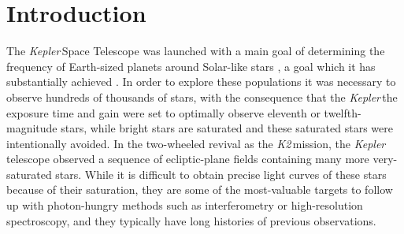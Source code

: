 \documentclass[twocolumn]{aastex62}
\newcommand\kepler{\emph{Kepler}\,}
\newcommand\ktwo{\emph{K2}\,}
\begin{document}
\begin{abstract}
While the \kepler\ mission was designed to look at tens of thousands of faint stars ($V \gtrsim 12$), brighter stars which saturate the detector are nevertheless some of the most interesting because of the ease with which they can be observed by other instruments and the wealth of knowledge about them that is already available. By considering the unsaturated scattered light `halo' around these stars we retrieve precise light curves of most of the brightest stars in \ktwo fields from Campaign 6 onwards. This halo campaign reveals stellar variability ubiquitously, including effects of stellar pulsation, rotation, and binarity. Here we describe our pipeline, and present a catalogue of the halo sources, with classifications and parametrizations of their variability and remarks on interesting objects. These light curves are publicly available as a High Level Science Product from the Mikulski Archive for Space Telescopes (MAST). \href{https://github.com/benjaminpope/k2halo}{\color{linkcolor}\faGithub} %
\end{abstract}



\section{Introduction} 
\label{sec:intro}

The \kepler Space Telescope was launched with a main goal of determining the frequency of Earth-sized planets around Solar-like stars \citep{2010sci...327..977b}, a goal which it has substantially achieved \citep[e.g.][]{2013ApJ...766...81F,2013PNAS..11019273P,2014ApJ...795...64F}. In order to explore these populations it was necessary to observe hundreds of thousands of stars, with the consequence that the \kepler the exposure time and gain were set to optimally observe eleventh or twelfth-magnitude stars, while bright stars are saturated and these saturated stars were intentionally avoided. In the two-wheeled revival as the \ktwo mission, the \kepler telescope observed a sequence of ecliptic-plane fields containing many more very-saturated stars. While it is difficult to obtain precise light curves of these stars because of their saturation, they are some of the most-valuable targets to follow up with photon-hungry methods such as interferometry or high-resolution spectroscopy, and they typically have long histories of previous observations. 
\end{document}
